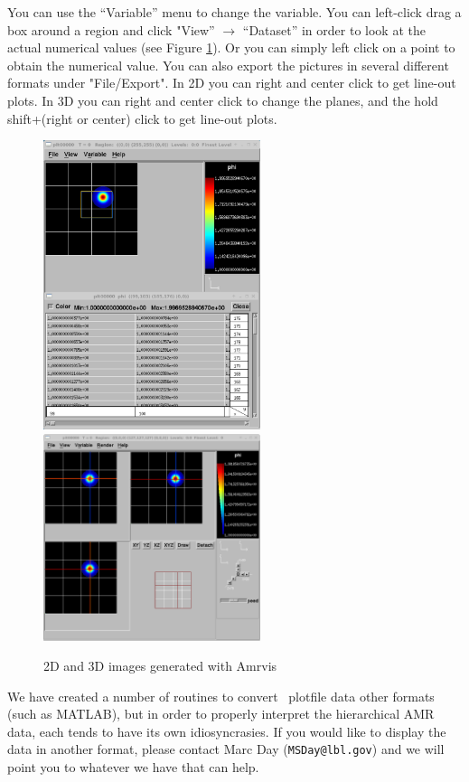 \begin{enumerate}
  You can use the ``Variable'' menu to change the variable.
  You can left-click drag a box around a region
  and click "View'' $\rightarrow$ ``Dataset''
  in order to look at the actual numerical values
  (see Figure \ref{Fig:Amrvis}).
  Or you can simply left click on a point to obtain the numerical value.
  You can also export the
  pictures in several different formats under "File/Export".
  In 2D you can right and center click to get line-out plots.
  In 3D you can right and center click to change the planes, and the hold
  shift+(right or center) click to get line-out plots.

\begin{figure}[tb]
\centering
\includegraphics[width=2.5in]{./Visualization/Amrvis_2d}
~~~
\includegraphics[width=2.5in]{./Visualization/Amrvis_3d}
\caption{2D and 3D images generated with Amrvis}
\label{Fig:Amrvis}
\end{figure}

  We have created a number of routines to convert \amrex\ plotfile data
  other formats (such as MATLAB), but in order to properly interpret 
  the hierarchical AMR data, each tends to have its own idiosyncrasies.
  If you would like to display the data in another format, please contact
  Marc Day ({\tt MSDay@lbl.gov}) and we will point you to whatever we have
  that can help.


\end{enumerate}
